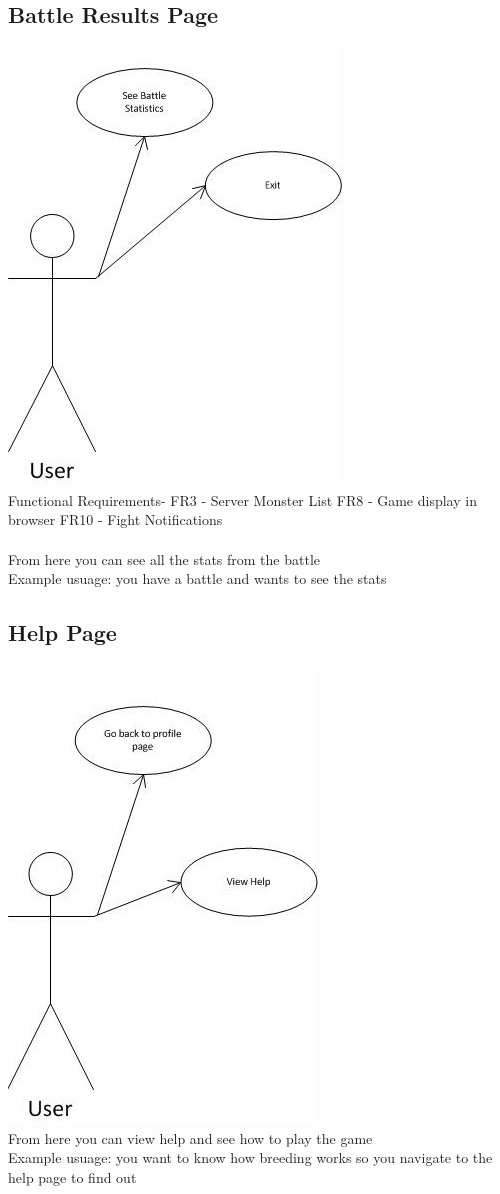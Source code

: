 \documentclass{project}
\begin{document}
\subsection{Battle Results Page}
\includegraphics[scale=0.6]{BattleResultsPageUseCase.jpg}
\\
Functional Requirements-
FR3 - Server Monster List
FR8 - Game display in browser
FR10 - Fight Notifications
\\
\\
From here you can see all the stats from the battle
\\
Example usuage: you have a battle and wants to see the stats

\newpage
\subsection{Help Page}
\includegraphics[scale=0.6]{HelpPageUseCase.jpg}
\\
From here you can view help and see how to play the game
\\
Example usuage: you want to know how breeding works so you navigate to the help page to find out
\end{document}
